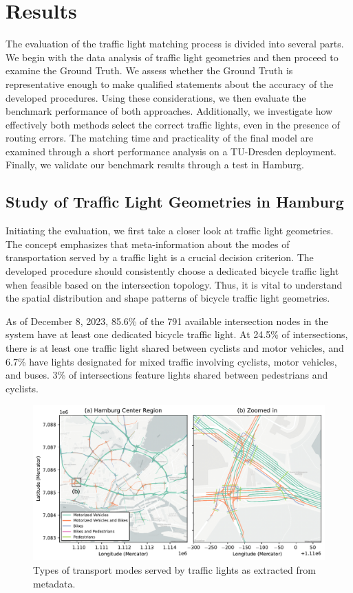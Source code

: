 \section{Results}

The evaluation of the traffic light matching process is divided into several parts. We begin with the data analysis of traffic light geometries and then proceed to examine the Ground Truth. We assess whether the Ground Truth is representative enough to make qualified statements about the accuracy of the developed procedures. Using these considerations, we then evaluate the benchmark performance of both approaches. Additionally, we investigate how effectively both methods select the correct traffic lights, even in the presence of routing errors. The matching time and practicality of the final model are examined through a short performance analysis on a TU-Dresden deployment. Finally, we validate our benchmark results through a test in Hamburg.

\subsection{Study of Traffic Light Geometries in Hamburg}

Initiating the evaluation, we first take a closer look at traffic light geometries. The concept emphasizes that meta-information about the modes of transportation served by a traffic light is a crucial decision criterion. The developed procedure should consistently choose a dedicated bicycle traffic light when feasible based on the intersection topology. Thus, it is vital to understand the spatial distribution and shape patterns of bicycle traffic light geometries.

As of December 8, 2023, 85.6\% of the 791 available intersection nodes in the system have at least one dedicated bicycle traffic light. At 24.5\% of intersections, there is at least one traffic light shared between cyclists and motor vehicles, and 6.7\% have lights designated for mixed traffic involving cyclists, motor vehicles, and buses. 3\% of intersections feature lights shared between pedestrians and cyclists.

\begin{figure}[t]
\centering
\includegraphics[width=\linewidth]{images/lanes-map.pdf}
\caption{Types of transport modes served by traffic lights as extracted from metadata.}
\label{fig:lanes-map}
\end{figure}

